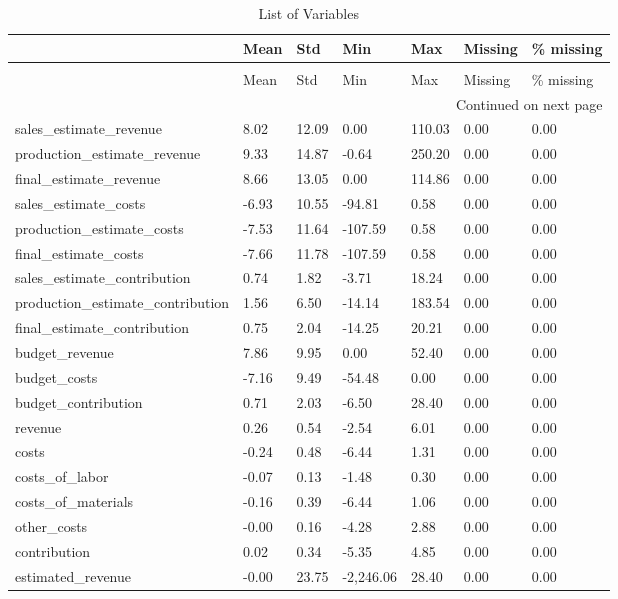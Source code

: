 \begin{landscape}\begin{longtable}[h!]{lllllll}
\caption{List of Variables} \label{eda_1} \\
\toprule
 & Mean & Std & Min & Max & Missing & \% missing \\
\midrule
\endfirsthead
\caption[]{List of Variables} \\
\toprule
 & Mean & Std & Min & Max & Missing & \% missing \\
\midrule
\endhead
\midrule
\multicolumn{7}{r}{Continued on next page} \\
\midrule
\endfoot
\bottomrule
\endlastfoot
sales_estimate_revenue & 8.02 & 12.09 & 0.00 & 110.03 & 0.00 & 0.00 \\
production_estimate_revenue & 9.33 & 14.87 & -0.64 & 250.20 & 0.00 & 0.00 \\
final_estimate_revenue & 8.66 & 13.05 & 0.00 & 114.86 & 0.00 & 0.00 \\
sales_estimate_costs & -6.93 & 10.55 & -94.81 & 0.58 & 0.00 & 0.00 \\
production_estimate_costs & -7.53 & 11.64 & -107.59 & 0.58 & 0.00 & 0.00 \\
final_estimate_costs & -7.66 & 11.78 & -107.59 & 0.58 & 0.00 & 0.00 \\
sales_estimate_contribution & 0.74 & 1.82 & -3.71 & 18.24 & 0.00 & 0.00 \\
production_estimate_contribution & 1.56 & 6.50 & -14.14 & 183.54 & 0.00 & 0.00 \\
final_estimate_contribution & 0.75 & 2.04 & -14.25 & 20.21 & 0.00 & 0.00 \\
budget_revenue & 7.86 & 9.95 & 0.00 & 52.40 & 0.00 & 0.00 \\
budget_costs & -7.16 & 9.49 & -54.48 & 0.00 & 0.00 & 0.00 \\
budget_contribution & 0.71 & 2.03 & -6.50 & 28.40 & 0.00 & 0.00 \\
revenue & 0.26 & 0.54 & -2.54 & 6.01 & 0.00 & 0.00 \\
costs & -0.24 & 0.48 & -6.44 & 1.31 & 0.00 & 0.00 \\
costs_of_labor & -0.07 & 0.13 & -1.48 & 0.30 & 0.00 & 0.00 \\
costs_of_materials & -0.16 & 0.39 & -6.44 & 1.06 & 0.00 & 0.00 \\
other_costs & -0.00 & 0.16 & -4.28 & 2.88 & 0.00 & 0.00 \\
contribution & 0.02 & 0.34 & -5.35 & 4.85 & 0.00 & 0.00 \\
estimated_revenue & -0.00 & 23.75 & -2,246.06 & 28.40 & 0.00 & 0.00 \\

\end{longtable}
\end{landscape}
